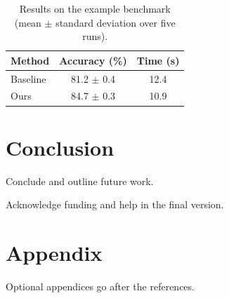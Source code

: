 \documentclass[acmsmall,review,anonymous]{acmart}
\begin{document}
\begin{table}[!htb]
  \caption{Results on the example benchmark (mean $\pm$ standard deviation over five runs).}
  \label{tab:results}
  \centering
  \begin{tabular}{lcc}
    \toprule
    Method   & Accuracy (\%)  & Time (s) \\
    \midrule
    Baseline & 81.2 $\pm$ 0.4 & 12.4     \\
    Ours     & 84.7 $\pm$ 0.3 & 10.9     \\
    \bottomrule
  \end{tabular}
\end{table}

\section{Conclusion}
Conclude and outline future work.

\begin{acks}
Acknowledge funding and help in the final version.
\end{acks}



\appendix

\section{Appendix}
Optional appendices go after the references.
\end{document}
